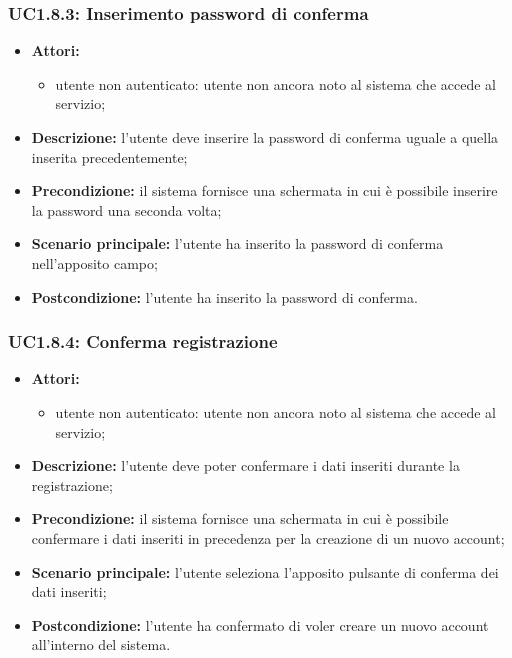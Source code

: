\subsubsection{UC1.8.3: Inserimento password di conferma}
\begin{itemize}
	\item \textbf{Attori:}
	\begin{itemize}
		\item utente non autenticato: utente non ancora noto al sistema che accede al servizio;
	\end{itemize}
	\item \textbf{Descrizione:} l'utente deve inserire la password di conferma uguale a quella inserita precedentemente;
	\item \textbf{Precondizione:} il sistema fornisce una schermata in cui è possibile inserire la password una seconda volta;
	\item \textbf{Scenario principale:} l'utente ha inserito la password di conferma nell'apposito campo;
	\item \textbf{Postcondizione:} l'utente ha inserito la password di conferma.
\end{itemize}

\subsubsection{UC1.8.4: Conferma registrazione}
\begin{itemize}
	\item \textbf{Attori:}
	\begin{itemize}
		\item utente non autenticato: utente non ancora noto al sistema che accede al servizio;
	\end{itemize}
	\item \textbf{Descrizione:} l'utente deve poter confermare i dati inseriti durante la registrazione;
	\item \textbf{Precondizione:} il sistema fornisce una schermata in cui è possibile confermare i dati inseriti in precedenza per la creazione di un nuovo account;
	\item \textbf{Scenario principale:} l'utente seleziona l'apposito pulsante di conferma dei dati inseriti;
	\item \textbf{Postcondizione:} l'utente ha confermato di voler creare un nuovo account all'interno del sistema.
\end{itemize}

